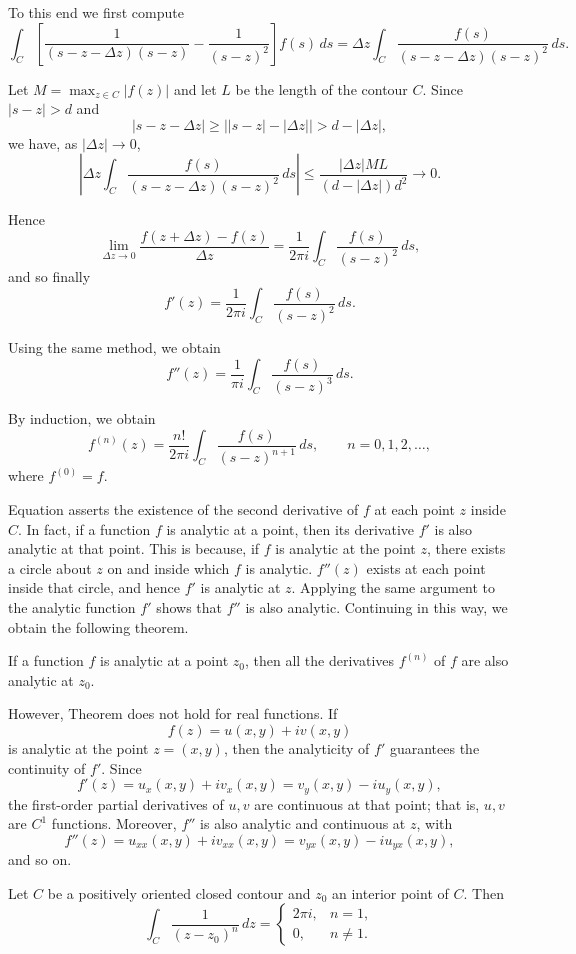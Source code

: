 \documentclass{article}
\begin{document}
To this end we first compute
\[
\int_C \left[\frac{1}{(s-z-\Delta z)(s-z)} - \frac{1}{(s-z)^2}\right]f(s)\,ds = \Delta z \int_C \frac{f(s)}{(s-z-\Delta z)(s-z)^2}\,ds.
\]

Let $M=\max_{z\in C}|f(z)|$ and let $L$ be the length of the contour $C$. Since $|s-z|>d$ and
\[
|s-z-\Delta z| \ge \big||s-z|-|\Delta z|\big| > d-|\Delta z|,
\]
we have, as $|\Delta z|\to 0$,
\[
\left|\Delta z\int_C \frac{f(s)}{(s-z-\Delta z)(s-z)^2}\,ds\right| \le \frac{|\Delta z| M L}{(d-|\Delta z|)d^2} \to 0.
\]

Hence
\[
\lim_{\Delta z\to 0} \frac{f(z+\Delta z)-f(z)}{\Delta z} = \frac{1}{2\pi i}\int_C \frac{f(s)}{(s-z)^2}\,ds,
\]
and so finally
\[
f'(z) = \frac{1}{2\pi i}\int_C \frac{f(s)}{(s-z)^2}\,ds. 
\]

Using the same method, we obtain
\[
f''(z) = \frac{1}{\pi i}\int_C \frac{f(s)}{(s-z)^3}\,ds. 
\]

By induction, we obtain
\[
f^{(n)}(z) = \frac{n!}{2\pi i}\int_C \frac{f(s)}{(s-z)^{n+1}}\,ds, \qquad n=0,1,2,\dots, 
\]
where $f^{(0)}=f$.

Equation asserts the existence of the second derivative of $f$ at each point $z$ inside $C$. In fact, if a function $f$ is analytic at a point, then its derivative $f'$ is also analytic at that point. This is because, if $f$ is analytic at the point $z$, there exists a circle about $z$ on and inside which $f$ is analytic. $f''(z)$ exists at each point inside that circle, and hence $f'$ is analytic at $z$. Applying the same argument to the analytic function $f'$ shows that $f''$ is also analytic. Continuing in this way, we obtain the following theorem.

\begin{theorem}
If a function $f$ is analytic at a point $z_0$, then all the derivatives $f^{(n)}$ of $f$ are also analytic at $z_0$.
\end{theorem}

However, Theorem does not hold for real functions. If
\[
f(z) = u(x,y) + iv(x,y)
\]
is analytic at the point $z=(x,y)$, then the analyticity of $f'$ guarantees the continuity of $f'$. Since
\[
f'(z) = u_x(x,y) + iv_x(x,y) = v_y(x,y) - iu_y(x,y),
\]
the first-order partial derivatives of $u,v$ are continuous at that point; that is, $u,v$ are $C^1$ functions. Moreover, $f''$ is also analytic and continuous at $z$, with
\[
f''(z) = u_{xx}(x,y) + iv_{xx}(x,y) = v_{yx}(x,y) - iu_{yx}(x,y),
\]
and so on.

\begin{example}
Let $C$ be a positively oriented closed contour and $z_0$ an interior point of $C$. Then
\[
\int_C \frac{1}{(z-z_0)^n}\,dz =
\begin{cases}
2\pi i, & n=1,\\
0, & n\ne 1.
\end{cases} 
\]
\end{example}
\end{document}
